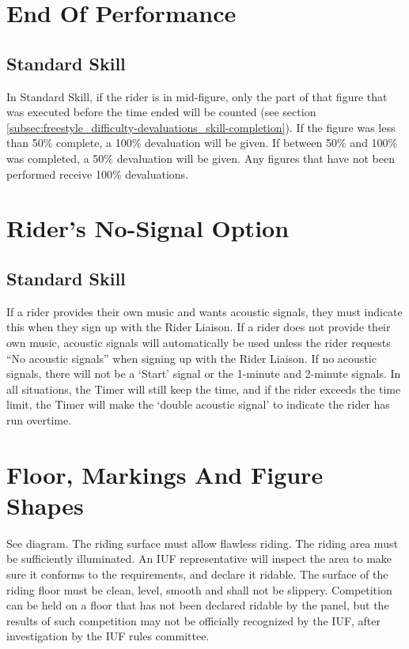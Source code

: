 \section{End Of Performance}

\subsection{Standard Skill}
In Standard Skill, if the rider is in mid-figure, only the part of that figure that was executed before the time ended will be counted (see section \ref{subsec:freestyle_difficulty-devaluations_skill-completion}).
If the figure was less than 50\% complete, a 100\% devaluation will be given.
If between 50\% and 100\% was completed, a 50\% devaluation will be given.
Any figures that have not been performed receive 100\% devaluations.

\section{Rider's No-Signal Option \label{sec:freestyle_riders-no-signal-option}}

\subsection{Standard Skill}
If a rider provides their own music and wants acoustic signals, they must indicate this when they sign up with the Rider Liaison.
If a rider does not provide their own music, acoustic signals will automatically be used unless the rider requests ``No acoustic signals'' when signing up with the Rider Liaison.
If no acoustic signals, there will not be a `Start' signal or the 1-minute and 2-minute signals.
In all situations, the Timer will still keep the time, and if the rider exceeds the time limit, the Timer will make the `double acoustic signal' to indicate the rider has run overtime.

\section{Floor, Markings And Figure Shapes}
See diagram.
The riding surface must allow flawless riding.
The riding area must be sufficiently illuminated.
An IUF representative will inspect the area to make sure it conforms to the requirements, and declare it ridable.
The surface of the riding floor must be clean, level, smooth and shall not be slippery.
Competition can be held on a floor that has not been declared ridable by the panel, but the results of such competition may not be officially recognized by the IUF, after investigation by the IUF rules committee.

